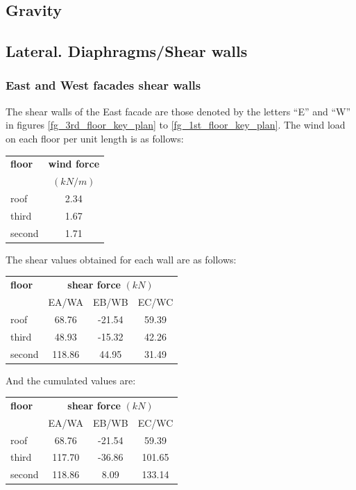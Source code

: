 \subsection{Gravity}

\subsection{Lateral. Diaphragms/Shear walls}

\subsubsection{East and West facades shear walls}
The shear walls of the East facade are those denoted by the letters ``E'' and ``W'' in figures \ref{fg_3rd_floor_key_plan} to \ref{fg_1st_floor_key_plan}. The wind load on each floor per unit length is as follows:

\begin{center}
  \begin{tabular}{|l|c|}
    \hline
    \textbf{floor} & \textbf{wind force}\\
    & $(kN/m)$\\
    \hline
    roof & 2.34 \\
    third & 1.67 \\
    second & 1.71 \\
    \hline
  \end{tabular}
\end{center}  

\noindent The shear values obtained for each wall are as follows:

\begin{center}
  \begin{tabular}{|l|c|c|c|}
    \hline
    \textbf{floor} & \multicolumn{3}{|c|}{\textbf{shear force} $(kN)$}\\
                   & EA/WA & EB/WB & EC/WC \\
    \hline
    roof & 68.76 & -21.54 & 59.39 \\
    third & 48.93 & -15.32 & 42.26 \\
    second & 118.86 & 44.95 & 31.49 \\
    \hline
  \end{tabular}
\end{center}  

\noindent And the cumulated values are:

\begin{center}
  \begin{tabular}{|l|c|c|c|}
    \hline
    \textbf{floor} & \multicolumn{3}{|c|}{\textbf{shear force} $(kN)$}\\
                   & EA/WA & EB/WB & EC/WC \\
    \hline
    roof & 68.76 & -21.54 & 59.39 \\
    third & 117.70 & -36.86 & 101.65 \\
    second & 118.86 & 8.09 & 133.14 \\
    \hline
  \end{tabular}
\end{center}

